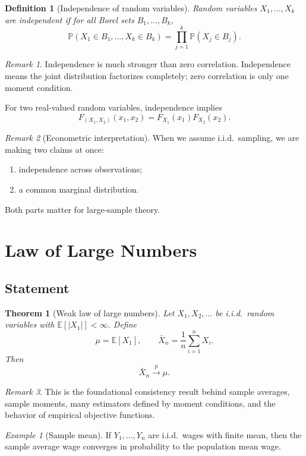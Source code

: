 \documentclass[11pt]{article}
\newtheorem{definition}{Definition}[section]
\newtheorem{theorem}{Theorem}[section]
\theoremstyle{remark}
\newtheorem{remark}{Remark}[section]
\newtheorem{example}{Example}[section]
\newcommand{\PP}{\mathbb{P}}
\newcommand{\EE}{\mathbb{E}}
\newcommand{\1}{\mathbbm{1}}
\begin{document}
\begin{definition}[Independence of random variables]
Random variables \(X_1,\dots,X_k\) are independent if for all Borel sets \(B_1,\dots,B_k\),
\[
  \PP(X_1 \in B_1,\dots,X_k \in B_k)=\prod_{j=1}^{k}\PP(X_j \in B_j).
\]
\end{definition}

\begin{remark}
Independence is much stronger than zero correlation. Independence means the joint distribution factorizes completely; zero correlation is only one moment condition.
\end{remark}

For two real-valued random variables, independence implies
\[
  F_{(X_1,X_2)}(x_1,x_2)=F_{X_1}(x_1)F_{X_2}(x_2).
\]

\begin{remark}[Econometric interpretation]
When we assume i.i.d.\ sampling, we are making two claims at once:
\begin{enumerate}[label=(\roman*)]
  \item independence across observations;
  \item a common marginal distribution.
\end{enumerate}
Both parts matter for large-sample theory.
\end{remark}

\section{Law of Large Numbers}

\subsection{Statement}

\begin{theorem}[Weak law of large numbers]
Let \(X_1,X_2,\dots\) be i.i.d.\ random variables with \(\EE[|X_1|]<\infty\). Define
\[
  \mu=\EE[X_1], \qquad \bar X_n = \frac{1}{n}\sum_{i=1}^{n} X_i.
\]
Then
\[
  \bar X_n \xrightarrow{p} \mu.
\]
\end{theorem}

\begin{remark}
This is the foundational consistency result behind sample averages, sample moments, many estimators defined by moment conditions, and the behavior of empirical objective functions.
\end{remark}

\begin{example}[Sample mean]
If \(Y_1,\dots,Y_n\) are i.i.d.\ wages with finite mean, then the sample average wage converges in probability to the population mean wage.
\end{example}
\end{document}
